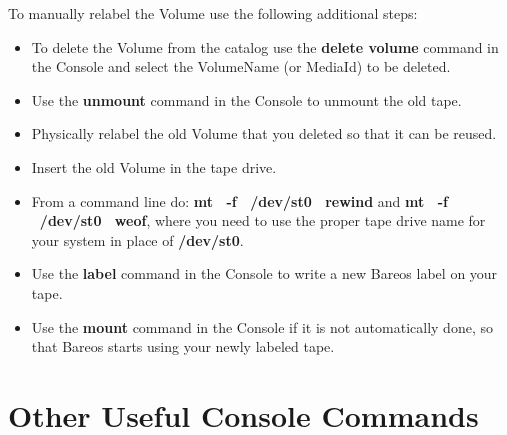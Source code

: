 To manually relabel the Volume use the following additional steps:

\begin{itemize}
\item To delete the Volume from the catalog use the {\bf delete volume}
   command in the Console and select the VolumeName (or MediaId) to be  deleted.

\item Use the {\bf unmount} command in the Console to unmount the  old tape.
\item Physically relabel the old Volume that you deleted so that it  can be
   reused.
\item Insert the old Volume in the tape drive.
\item From a command line do: {\bf mt \ -f \ /dev/st0 \ rewind} and  {\bf mt \
   -f \ /dev/st0 \ weof}, where you need to use the proper  tape drive name for
   your system in place of {\bf /dev/st0}.
\item Use the {\bf label} command in the Console to write a new  Bareos label
   on your tape.
\item Use the {\bf mount} command in the Console if it is not automatically
   done, so that Bareos starts using your newly labeled tape.
   \end{itemize}

\section{Other Useful Console Commands}


